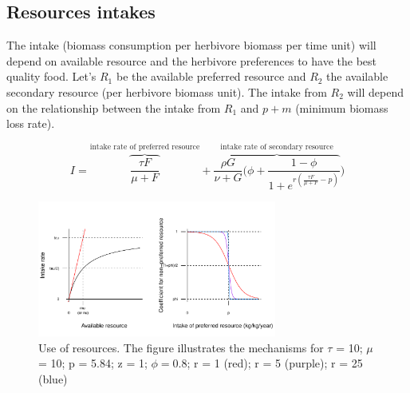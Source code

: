 
\subsection{Resources intakes}

The intake (biomass consumption per herbivore biomass per time unit) will
depend on available resource and the herbivore preferences to have the best
quality food. Let's $R_1$ be the available preferred resource and $R_2$ the
available secondary resource (per herbivore biomass unit). The intake from
$R_2$ will depend on the relationship between the intake from $R_1$ and $p+m$
(minimum biomass loss rate).

\[
I = \overbrace{\frac{\tau F}{\mu+F}}^\text{intake rate of preferred resource} 
+ \overbrace{\frac{\rho G}{\nu+G}\Big(\phi + \frac{1-\phi}{ 1+e^{r(\frac{\tau F}{\mu+F} - p)}}}^\text{intake rate of secondary resource} \Big)
\]



\begin{figure}
\includegraphics[width=0.7\textwidth]{../graphs/intakes.pdf}
   
   \caption{Use of resources. The figure illustrates the mechanisms for $\tau$ = 10; $\mu$ = 10; p = 5.84; z = 1; $\phi=0.8$; r = 1 (red); r = 5 (purple); r = 25 (blue)}
\label{resources}
\end{figure}

